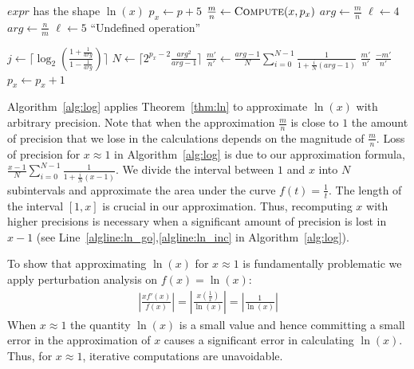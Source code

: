 \documentclass{article}
\newcommand{\true}{\textit{true}}
\newcommand{\expr}{\textit{expr}}
\numberwithin{mytheorem}{section}
\newcommand{\lnsumu}[2] {\frac{#1-1}{#2} \sum_{i=0}^{#2-1}\frac{1}{1+\frac{i}{#2}(#1-1)}}
\begin{document}
\begin{algorithm}
\caption{Natural Logarithm}\label{alg:log}
\begin{algorithmic}[1]
\Require $\expr$ has the shape $\ln(x)$
\Procedure{Compute}{$\expr,p$}
\State $p_x \gets p+5$
\Repeat \label{algline:ln_go}
\State $\frac{m}{n} \gets \Call{Compute}{x,p_x}$
	\State $\textit{arg}\gets \frac{m}{n}$
	\State $\ell \gets 4$
	\State $\textit{arg}\gets \frac{n}{m}$
	\State $\ell \gets 5$
\Else
	\State ``Undefined operation''
\EndIf

\State $j\gets \lceil\log_2(\frac{1+\frac{1}{\textit{arg}}}{1-\frac{1}{\textit{arg}}}) \rceil$
	\State $N\gets \lceil 2^{p_x-2}\frac{\textit{arg}^2}{\textit{arg}-1}\rceil$
	\State $\frac{m'}{n'}\gets \lnsumu{\textit{arg}}{N}$
		\State \Return $\frac{m'}{n'}$
	\Else
		\State \Return $\frac{-m'}{n'}$
	\EndIf
\Else
	\State $p_x\gets p_x+1$ \label{algline:ln_inc}
\EndIf
\Until{$\true$}
\EndProcedure
\end{algorithmic}
\end{algorithm}

Algorithm~\ref{alg:log} applies Theorem~\ref{thm:ln} to approximate $\ln(x)$ with arbitrary precision. Note that when the approximation $\frac{m}{n}$ is close to $1$ the amount of precision that we lose in the calculations depends on the magnitude of $\frac{m}{n}$. Loss of precision for $x\approx 1$ in Algorithm~\ref{alg:log} is due to our approximation formula, $\lnsumu{x}{N}$. We divide the interval between $1$ and $x$ into $N$ subintervals and approximate the area under the curve $f(t)=\frac{1}{t}$. The length of the interval $[1,x]$ is crucial in our approximation. Thus, recomputing $x$ with higher precisions is necessary when a significant amount of precision is lost in $x-1$ (see Line~\ref{algline:ln_go},\ref{algline:ln_inc} in Algorithm~\ref{alg:log}). 

To show that approximating $\ln(x)$ for $x\approx 1$ is fundamentally problematic we apply perturbation analysis  on $f(x)=\ln(x)$:  
\begin{align*}
|\frac{xf'(x)}{f(x)}|=|\frac{x(\frac{1}{x})}{\ln(x)}|=|\frac{1}{\ln(x)}|
\end{align*}
When $x\approx 1$ the quantity $\ln(x)$ is a small value and hence committing a small error in the approximation of $x$ causes a significant error in calculating $\ln(x)$. Thus, for $x\approx 1$, iterative computations  are unavoidable. 
\end{document}
